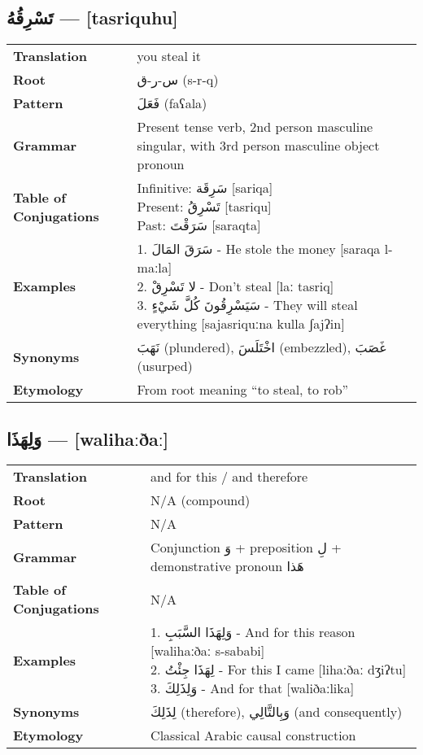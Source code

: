 \documentclass[a4paper,12pt]{article}
\begin{document}
\subsection{\textarabic{تَسْرِقُهُ} — [tasriquhu]}
\begin{tabular}{p{3cm}p{10cm}}
\toprule
\textbf{Translation} & you steal it \\
\textbf{Root} & \textarabic{س-ر-ق} (s-r-q) \\
\textbf{Pattern} & \textarabic{فَعَلَ} (faʕala) \\
\textbf{Grammar} & Present tense verb, 2nd person masculine singular, with 3rd person masculine object pronoun \\
\textbf{Table of Conjugations} & \makecell[l]{
Infinitive: \textarabic{سَرِقَة} [sariqa] \\
Present: \textarabic{تَسْرِقُ} [tasriqu] \\
Past: \textarabic{سَرَقْتَ} [saraqta]
} \\
\textbf{Examples} & \makecell[l]{\parbox{9.5cm}{
1. \textarabic{سَرَقَ المَالَ} - He stole the money [saraqa l-maːla]\\
2. \textarabic{لا تَسْرِقْ} - Don't steal [laː tasriq]\\
3. \textarabic{سَيَسْرِقُونَ كُلَّ شَيْءٍ} - They will steal everything [sajasriquːna kulla ʃajʔin]
}} \\
\midrule
\textbf{Synonyms} & \textarabic{نَهَبَ} (plundered), \textarabic{اخْتَلَسَ} (embezzled), \textarabic{غَصَبَ} (usurped) \\
\textbf{Etymology} & From root meaning ``to steal, to rob'' \\
\bottomrule
\end{tabular}

\subsection{\textarabic{وَلِهَذَا} — [walihaːðaː]}
\begin{tabular}{p{3cm}p{10cm}}
\toprule
\textbf{Translation} & and for this / and therefore \\
\textbf{Root} & N/A (compound) \\
\textbf{Pattern} & N/A \\
\textbf{Grammar} & Conjunction \textarabic{وَ} + preposition \textarabic{لِ} + demonstrative pronoun \textarabic{هَذا} \\
\textbf{Table of Conjugations} & N/A \\
\textbf{Examples} & \makecell[l]{\parbox{9.5cm}{
1. \textarabic{وَلِهَذَا السَّبَبِ} - And for this reason [walihaːðaː s-sababi]\\
2. \textarabic{لِهَذَا جِئْتُ} - For this I came [lihaːðaː dʒiʔtu]\\
3. \textarabic{وَلِذَلِكَ} - And for that [waliðaːlika]
}} \\
\midrule
\textbf{Synonyms} & \textarabic{لِذَلِكَ} (therefore), \textarabic{وَبِالتَّالِي} (and consequently) \\
\textbf{Etymology} & Classical Arabic causal construction \\
\bottomrule
\end{tabular}
\end{document}
